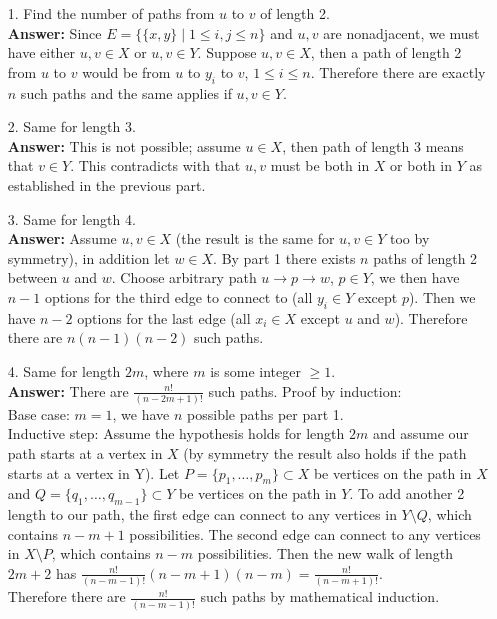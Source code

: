 \documentclass{article}
\begin{document}
\begin{itemize}
          \begin{itemize}
              \item [1.] Find the number of paths from $u$ to $v$ of length 2.\\\textbf{Answer: } Since $E=\{\{x,y\}\mid 1\leq i,j\leq n\}$ and $u,v$ are nonadjacent, we must have either $u,v\in X$ or $u,v\in Y$. Suppose $u,v\in X$, then a path of length 2 from $u$ to $v$ would be from $u$ to $y_i$ to $v$, $1\leq i\leq n$. Therefore there are exactly $n$ such paths and the same applies if $u,v\in Y$.
              \item [2.] Same for length 3.\\\textbf{Answer: } This is not possible; assume $u\in X$, then path of length 3 means that $v\in Y$. This contradicts with that $u,v$ must be both in $X$ or both in $Y$ as established in the previous part.
              \item [3.] Same for length 4.\\\textbf{Answer: } Assume $u,v\in X$ (the result is the same for $u,v\in Y$ too by symmetry), in addition let $w\in X$. By part 1 there exists $n$ paths of length 2 between $u$ and $w$. Choose arbitrary path $u\rightarrow p\rightarrow w$, $p\in Y$, we then have $n-1$ options for the third edge to connect to (all $y_i\in Y$ except $p$). Then we have $n-2$ options for the last edge (all $x_i\in X$ except $u$ and $w$). Therefore there are $n(n-1)(n-2)$ such paths.
              \item [4.] Same for length $2m$, where $m$ is some integer $\geq 1$.\\\textbf{Answer: } There are $\frac{n!}{(n-2m+1)!}$ such paths. Proof by induction:\\Base case: $m=1$, we have $n$ possible paths per part 1.\\Inductive step: Assume the hypothesis holds for length $2m$ and assume our path starts at a vertex in $X$ (by symmetry the result also holds if the path starts  at a vertex in Y). Let $P=\{p_1,\ldots,p_m\}\subset X$ be vertices on the path in $X$ and $Q=\{q_1,\ldots,q_{m-1}\}\subset Y$ be vertices on the path in $Y$. To add another 2 length to our path, the first edge can connect to any vertices in $Y\setminus Q$, which contains $n-m+1$ possibilities. The second edge can connect to any vertices in $X\setminus P$, which contains $n-m$ possibilities. Then the new walk of length $2m+2$ has $\frac{n!}{(n-m-1)!}(n-m+1)(n-m)=\frac{n!}{(n-m+1)!}$.\\Therefore there are $\frac{n!}{(n-m-1)!}$ such paths by mathematical induction.
          \end{itemize}
\end{itemize}
\end{document}
